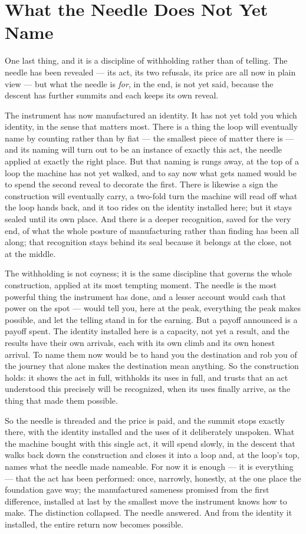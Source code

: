 \section{What the Needle Does Not Yet Name}

One last thing, and it is a discipline of withholding rather than of telling. The needle has been revealed --- its
act, its two refusals, its price are all now in plain view --- but what the needle is \emph{for}, in the end, is
not yet said, because the descent has further summits and each keeps its own reveal.

The instrument has now manufactured an identity. It has not yet told you which identity, in the
sense that matters most. There is a thing the loop will eventually name by counting rather than by fiat --- the
smallest piece of matter there is --- and its naming will turn out to be an instance of exactly this act, the
needle applied at exactly the right place. But that naming is rungs away, at the top of a loop the machine has
not yet walked, and to say now what gets named would be to spend the second reveal to decorate the first. There is
likewise a sign the construction will eventually carry, a two-fold turn the machine will read off what the loop
hands back, and it too rides on the identity installed here; but it stays sealed until its own place. And there
is a deeper recognition, saved for the very end, of what the whole posture of manufacturing rather than finding
has been all along; that recognition stays behind its seal because it belongs at the close, not at the middle.

The withholding is not coyness; it is the same discipline that governs the whole construction, applied at its most
tempting moment. The needle is the most powerful thing the instrument has done, and a lesser account would cash
that power on the spot --- would tell you, here at the peak, everything the peak makes possible, and let the
telling stand in for the earning. But a payoff announced is a payoff spent. The identity installed here is a
capacity, not yet a result, and the results have their own arrivals, each with its own climb and
its own honest arrival. To name them now would be to hand you the destination and rob you of the journey that
alone makes the destination mean anything. So the construction holds: it shows the act in full, withholds its
uses in full, and trusts that an act understood this precisely will be recognized, when its uses finally arrive,
as the thing that made them possible.

So the needle is threaded and the price is paid, and the summit stops exactly there, with the identity installed
and the uses of it deliberately unspoken. What the machine bought with this single act, it will spend slowly, in
the descent that walks back down the construction and closes it into a loop and, at the loop's top, names what
the needle made nameable. For now it is enough --- it is everything --- that the act has been performed: once,
narrowly, honestly, at the one place the foundation gave way; the manufactured sameness promised from the first
difference, installed at last by the smallest move the instrument knows how to make. The distinction collapsed.
The needle answered. And from the identity it installed, the entire return now becomes possible.
